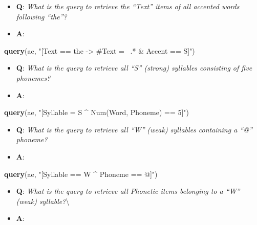 \documentclass[]{book}
\newenvironment{Shaded}{\begin{snugshade}}{\end{snugshade}}
\newcommand{\KeywordTok}[1]{\textcolor[rgb]{0.13,0.29,0.53}{\textbf{#1}}}
\newcommand{\NormalTok}[1]{#1}
\newcommand{\StringTok}[1]{\textcolor[rgb]{0.31,0.60,0.02}{#1}}
\providecommand{\tightlist}{%
  \setlength{\itemsep}{0pt}\setlength{\parskip}{0pt}}
\begin{document}
\begin{itemize}
\tightlist
\item
  \textbf{Q}: \emph{What is the query to retrieve the ``Text'' items of all accented words following ``the''?}
\item
  \textbf{A}:
\end{itemize}

\begin{Shaded}
\begin{Highlighting}[]
\KeywordTok{query}\NormalTok{(ae, }\StringTok{"[Text == the -> #Text =~ .* & Accent == S]"}\NormalTok{)}
\end{Highlighting}
\end{Shaded}

\begin{itemize}
\tightlist
\item
  \textbf{Q}: \emph{What is the query to retrieve all ``S'' (strong) syllables consisting of five phonemes?}
\item
  \textbf{A}:
\end{itemize}

\begin{Shaded}
\begin{Highlighting}[]
\KeywordTok{query}\NormalTok{(ae, }\StringTok{"[Syllable = S ^ Num(Word, Phoneme) == 5]"}\NormalTok{)}
\end{Highlighting}
\end{Shaded}

\begin{itemize}
\tightlist
\item
  \textbf{Q}: \emph{What is the query to retrieve all ``W'' (weak) syllables containing a ``@'' phoneme?}
\item
  \textbf{A}:
\end{itemize}

\begin{Shaded}
\begin{Highlighting}[]
\KeywordTok{query}\NormalTok{(ae, }\StringTok{"[Syllable == W ^ Phoneme == @]"}\NormalTok{)}
\end{Highlighting}
\end{Shaded}

\begin{itemize}
\tightlist
\item
  \textbf{Q}: \emph{What is the query to retrieve all Phonetic items belonging to a ``W'' (weak) syllable?}\textbackslash{}
\item
  \textbf{A}:
\end{itemize}
\end{document}
